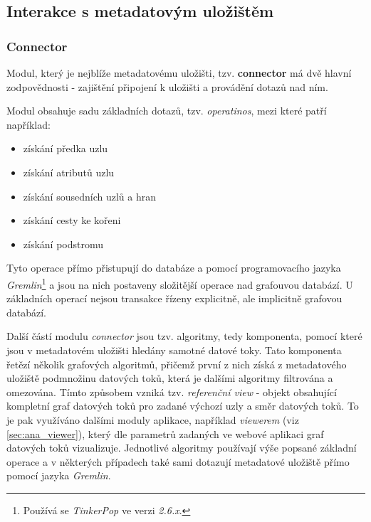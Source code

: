
\subsection{Interakce s metadatovým uložištěm}
\label{sec:ana_interactions}


\subsubsection{Connector}
\label{sec:ana_connector}
Modul, který je nejblíže metadatovému uložišti, tzv. \textbf{connector} má dvě hlavní zodpovědnosti - zajištění připojení k uložišti a provádění dotazů nad ním. 

Modul obsahuje sadu základních dotazů, tzv. \textit{operatinos}, mezi které patří například: 
\begin{itemize}
	\item{získání předka uzlu}
	\item{získání atributů uzlu}
	\item{získání sousedních uzlů a hran}
	\item{získání cesty ke kořeni}
	\item{získání podstromu}
\end{itemize} 
Tyto operace přímo přistupují do databáze a pomocí programovacího jazyka \textit{Gremlin}\footnote{Používá se \textit{TinkerPop} ve verzi \textit{2.6.x}.} a jsou na nich postaveny složitější operace nad grafouvou databází. U základních operací nejsou transakce řízeny explicitně, ale implicitně grafovou databází.

Další částí modulu \textit{connector} jsou tzv. algoritmy, tedy komponenta, pomocí které jsou v metadatovém uložišti hledány samotné datové toky. Tato komponenta řetězí několik grafových algoritmů, přičemž první z nich získá z metadatového uložiště podmnožinu datových toků, která je dalšími algoritmy filtrována a omezována. Tímto způsobem vzniká tzv. \textit{referenční view} - objekt obsahující kompletní graf datových toků pro zadané výchozí uzly a směr datových toků. To je pak využíváno dalšími moduly aplikace, například \textit{viewerem} (viz \ref{sec:ana_viewer}), který dle parametrů zadaných ve webové aplikaci graf datových toků vizualizuje.   
Jednotlivé algoritmy používají výše popsané základní operace a v některých případech také sami dotazují metadatové uložiště přímo pomocí jazyka \textit{Gremlin}. 

